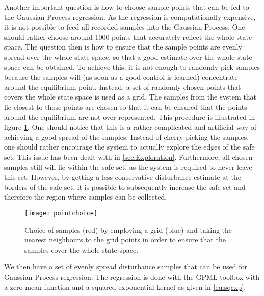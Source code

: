 \documentclass[../main.tex]{subfiles}
\begin{document}
Another important question is how to choose sample points that can be fed to the Gaussian Process regression. As the regression is computationally expensive, it is not possible to feed all recorded samples into the Gaussian Process. One should rather choose around $1000$ points that accurately reflect the whole state space. The question then is how to ensure that the sample points are evenly spread over the whole state space, so that a good estimate over the whole state space can be obtained. To achieve this, it is not enough to randomly pick samples because the samples will (as soon as a good control is learned) concentrate around the equilibrium point. Instead, a set of randomly chosen points that covers the whole state space is used as a grid. The samples from the system that lie closest to those points are chosen so that it can be ensured that the points around the equilibrium are not over-represented.  This procedure is illustrated in figure \ref{fig:pointchoice}. One should notice that this is a rather complicated and artificial way of achieving a good spread of the samples. Instead of cherry picking the samples, one should rather encourage the system to actually explore the edges of the safe set. This issue has been dealt with in \ref{sec:Exploration}. Furthermore, all chosen samples still will lie within the safe set, as the system is required to never leave this set. However, by getting a less conservative disturbance estimate at the borders of the safe set, it is possible to subsequently increase the safe set and therefore the region where samples can be collected.

\begin{figure}
    \centering
    \texttt{[image: pointchoice]}
        \caption{Choice of samples (red) by employing a grid (blue) and taking the nearest neighbours to the grid points in order to ensure that the samples cover the whole state space.}  \label{fig:pointchoice}
\end{figure}

We then have a set of evenly spread disturbance samples that can be used for Gaussian Process regression. The regression is done with the GPML toolbox \cite{Rasmussen:2010:GPM:1756006.1953029} with a zero mean function and a squared exponential kernel as given in \eqref{eq:sqexp}.
\end{document}
